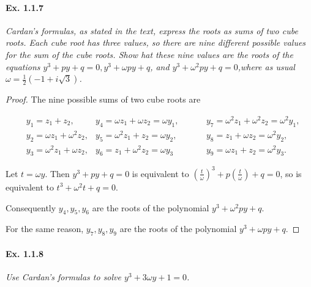 \documentclass[11pt,a4paper]{article}
\begin{document}
\paragraph{Ex. 1.1.7}

{\it Cardan's formulas, as stated in the text, express the roots as sums of two cube roots. Each cube root has three values, so there are nine different possible values for the sum of the cube roots. Show hat these nine values are the roots of the equations $y^3+py+q=0, y^3+\omega py+q$, and $y^3+\omega^2py+q=0$,where as usual $\omega = \frac{1}{2}(-1 + i \sqrt{3})$.
}

\begin{proof}
The nine possible sums of two cube roots are

\begin{align*}
&y_1 = z_1 + z_2, &y_4 = \omega z_1+\omega z_2 = \omega y_1,\hspace{1cm} &y_7 = \omega^2z_1+\omega^2 z_2 = \omega^2 y_1,\\
&y_2=\omega z_1+\omega^2 z_2, &y_5 = \omega^2z_1+z_2=\omega y_2, \hspace{1cm}  &y_8 = z_1+\omega z_2=\omega^2 y_2,\\
&y_3= \omega^2z_1+\omega z_2, &y_6 = z_1+\omega^2z_2 = \omega y_3 \hspace{1cm}  &y_9 = \omega z_1+z_2 = \omega^2 y_3.
\end{align*}

Let $t=\omega y$. Then
$y^3+py+q=0$ is equivalent to $\left ( \frac{t}{\omega} \right )^3+ p \left ( \frac{t}{\omega} \right )+q = 0$, so is equivalent to $t^3+\omega^2 t +q=0$.

Consequently $y_4,y_5,y_6$ are the roots of the polynomial $y^3 + \omega^2 p y + q$.

For the same reason, $y_7,y_8,y_9$ are the roots of the polynomial $y^3 + \omega p y +q$.
\end{proof}

\paragraph{Ex. 1.1.8} 

{\it Use Cardan's formulas to solve $y^3+3\omega y+1 = 0$.
}
\end{document}
